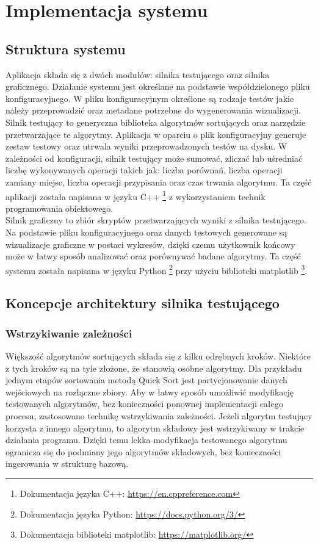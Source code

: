 \chapter{Implementacja systemu}
\thispagestyle{chapterBeginStyle}


\section{Struktura systemu}
Aplikacja składa się z dwóch modułów: silnika testującego oraz silnika graficznego.
Działanie systemu jest określane na podstawie współdzielonego pliku konfiguracyjnego. W pliku konfiguracyjnym
określone są rodzaje testów jakie należy przeprowadzić oraz metadane potrzebne do wygenerowania wizualizacji.\\

Silnik testujący to generyczna biblioteka algorytmów sortujących oraz narzędzie przetwarzające
te algorytmy. Aplikacja w oparciu o plik konfiguracyjny generuje zestaw testowy oraz utrwala
wyniki przeprowadzonych testów na dysku. W zależności od konfiguracji, silnik testujący może
sumować, zliczać lub uśredniać liczbę wykonywanych operacji takich jak: liczba porównań, liczba
operacji zamiany miejsc, liczba operacji przypisania oraz czas trwania algorytmu. Ta część aplikacji
została napisana w języku C++ \footnote{Dokumentacja języka C++: \url{https://en.cppreference.com}}
z wykorzystaniem technik programowania obiektowego.\\

Silnik graficzny to zbiór skryptów przetwarzających wyniki z silnika testującego. Na podstawie pliku
konfiguracyjnego oraz danych testowych generowane są wizualizacje graficzne w postaci wykresów, dzięki
czemu użytkownik końcowy może w łatwy sposób analizować oraz porównywać badane algorytmy. Ta część
systemu została napisana w języku Python \footnote{Dokumentacja języka Python: \url{https://docs.python.org/3/}}
przy użyciu biblioteki matplotlib \footnote{Dokumentacja biblioteki matplotlib: \url{https://matplotlib.org/}}.


\section{Koncepcje architektury silnika testującego}

\subsection{Wstrzykiwanie zależności}
Większość algorytmów sortujących składa się z kilku odrębnych kroków. Niektóre z tych kroków są na tyle
złożone, że stanowią osobne algorytmy. Dla przykładu jednym etapów sortowania metodą Quick Sort
jest partycjonowanie danych wejściowych na rozłączne zbiory. Aby w łatwy sposób umożliwić modyfikację
testowanych algorytmów, bez konieczności ponownej implementacji całego procesu, zastosowano technikę
wstrzykiwania zależności. Jeżeli algorytm testujący korzysta z innego algorytmu, to algorytm składowy
jest wstrzykiwany w trakcie działania programu. Dzięki temu lekka modyfikacja testowanego algorytmu
ogranicza się do podmiany jego algorytmów składowych, bez konieczności ingerowania w strukturę bazową.

